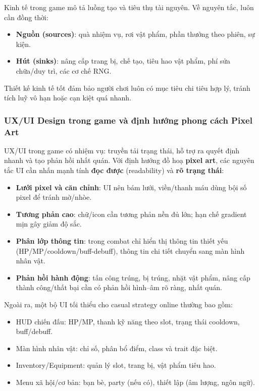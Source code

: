 Kinh tế trong game mô tả luồng tạo và tiêu thụ tài nguyên\cite{adams-game-design}. Về nguyên tắc, luôn cần đồng thời:
\begin{itemize}
    \item \textbf{Nguồn (sources)}: quà nhiệm vụ, rơi vật phẩm, phần thưởng theo phiên, sự kiện.
    \item \textbf{Hút (sinks)}: nâng cấp trang bị, chế tạo, tiêu hao vật phẩm, phí sửa chữa/\allowbreak duy trì, các cơ chế RNG.
\end{itemize}
Thiết kế kinh tế tốt đảm bảo người chơi luôn có mục tiêu chi tiêu hợp lý, tránh tích luỹ vô hạn hoặc cạn kiệt quá nhanh.

\subsubsection{UX/\allowbreak UI Design trong game và định hướng phong cách Pixel Art}

UX/\allowbreak UI trong game có nhiệm vụ: truyền tải trạng thái, hỗ trợ ra quyết định nhanh và tạo phản hồi nhất quán\cite{schell-art}. Với định hướng đồ hoạ \textbf{pixel art}, các nguyên tắc UI cần nhấn mạnh tính \textbf{đọc được} (readability) và \textbf{rõ trạng thái}:

\begin{itemize}
    \item \textbf{Lưới pixel và căn chỉnh}: UI nên bám lưới, viền/\allowbreak thanh máu dùng bội số pixel để tránh mờ/\allowbreak nhòe.
    \item \textbf{Tương phản cao}: chữ/\allowbreak icon cần tương phản nền đủ lớn; hạn chế gradient mịn gây giảm độ sắc.
    \item \textbf{Phân lớp thông tin}: trong combat chỉ hiển thị thông tin thiết yếu (HP/\allowbreak MP/\allowbreak cooldown/\allowbreak buff-debuff), thông tin chi tiết chuyển sang màn hình nhân vật.
    \item \textbf{Phản hồi hành động}: tấn công trúng, bị trúng, nhặt vật phẩm, nâng cấp thành công/\allowbreak thất bại cần có phản hồi hình--âm rõ ràng, nhất quán.
\end{itemize}

Ngoài ra, một bộ UI tối thiểu cho casual strategy online thường bao gồm:
\begin{itemize}
    \item HUD chiến đấu: HP/\allowbreak MP, thanh kỹ năng theo slot, trạng thái cooldown, buff/\allowbreak debuff.
    \item Màn hình nhân vật: chỉ số, phân bổ điểm, class và trait đặc biệt.
    \item Inventory/\allowbreak Equipment: quản lý slot, trang bị, vật phẩm tiêu hao.
    \item Menu xã hội/\allowbreak cơ bản: bạn bè, party (nếu có), thiết lập (âm lượng, ngôn ngữ).
\end{itemize}

